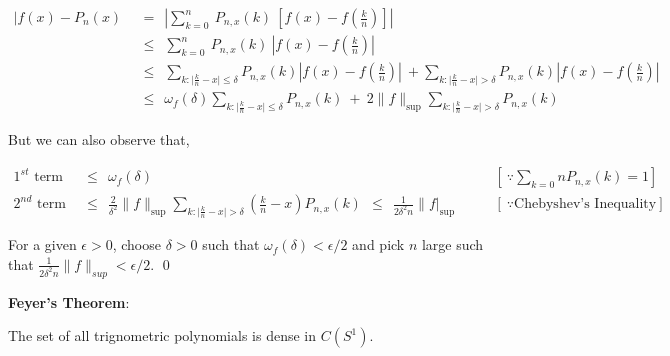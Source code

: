 \begin{align*}
\vert f(x) - P_n(x)\ \  & = \ \  \left\lvert \sum\limits_{k=0}^{n} \ P_{n,x}(k) \ \left[ f(x) - f\left(  \frac{k}{n} \right) \right] \right\rvert \\
                    & \leq \ \  \sum\limits_{k=0}^{n} \ P_{n,x}(k) \  \left\lvert f(x) - f\left( \frac{k}{n} \right) \right\rvert \\
                    & \leq \ \  \sum\limits_{k: \vert \frac{k}{n} - x\vert \leq \delta}P_{n,x}(k)  \left\lvert f(x) - f\left(  \frac{k}{n}
                    \right) \right\rvert \  + \sum\limits_{k: \vert \frac{k}{n} - x\vert > \delta} P_{n,x}(k)  \left\lvert f(x) - f\left(  \frac{k}{n} \right) \right\rvert \\
                    & \leq \ \  \omega_{f}(\delta) \sum\limits_{k: \vert \frac{k}{n} - x\vert \leq \delta}P_{n,x}(k) \ +  \ 2 \lVert f \rVert_{\sup} \sum\limits_{k: \vert \frac{k}{n} - x\vert > \delta} P_{n,x}(k)
\end{align*}

\noindent But we can also observe that,

\setlength{\belowdisplayskip}{0pt} \setlength{\belowdisplayshortskip}{0pt}
\setlength{\abovedisplayskip}{0pt} \setlength{\abovedisplayshortskip}{0pt}

\begin{align*}
1^{st} \textrm{ term} \ \ & \leq  \ \ \omega_{f}(\delta)   & \left[ \ \because \sum\limits_{k=0}{n} P_{n,x} (k)  = 1 \right] \\
2^{nd} \textrm{ term}\ \  & \leq  \ \ \frac{2}{\delta^2}\lVert f \rVert_{\sup} \sum\limits_{k: \vert \frac{k}{n} - x\vert > \delta}
                                \left( \frac{k}{n} - x \right) P_{n,x}(k) \ \ \leq \ \ \frac{1}{2\delta^2 n} \lVert f \rvert_{\sup} \quad \quad & \left[\ \because \textrm{Chebyshev's Inequality} \right]
\end{align*}

\vspace{0.1in}

\noindent For a given $\epsilon > 0$, choose $\delta > 0$ such that $\omega_{f}(\delta) < \epsilon / 2$  and  pick $n$ large such  that $ \displaystyle\frac{1}{2\delta^2 n} \lVert f \rVert_{sup} < \epsilon / 2 $. \qed

\vspace{0.2in}

\noindent \textbf{Feyer's Theorem}:

\vspace{0.1in}

The set of all trignometric polynomials is dense in $C(S^1)$.
